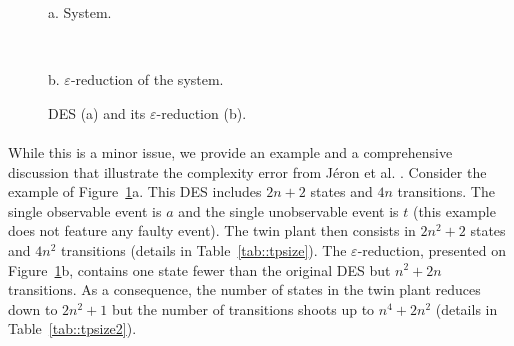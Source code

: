 \documentclass{article}
\begin{document}
\begin{figure}[ht]
\begin{minipage}{0.47\linewidth}
\begin{center}
\begin{tikzpicture}[->,>=stealth',shorten >=1pt,auto,node distance=2cm,
                    semithick]
\end{tikzpicture}
  \end{center}
  \end{minipage}

  \begin{minipage}{0.47\linewidth}
  \begin{center}
    {a. System.}
  \end{center}
  \end{minipage}\begin{minipage}{0.06\linewidth}
  \ 
  \end{minipage}\begin{minipage}{0.47\linewidth}
  \begin{center}
    {b. $\varepsilon$-reduction of the system.}
  \end{center}
  \end{minipage}
  \caption{DES (a) and its $\varepsilon$-reduction (b).}
  \label{fig::quadra}
\end{figure}

\paragraph{}
While this is a minor issue, 
we provide an example and a comprehensive discussion 
that illustrate the complexity error from J\'eron et al. 
\cite{jeron-etal::wc::08}.  
Consider the example of Figure~\ref{fig::quadra}a.  
This DES includes $2n+2$ states and $4n$ transitions.  
The single observable event is $a$ 
and the single unobservable event is $t$ 
(this example does not feature any faulty event).  
The twin plant then consists in $2n^2+2$ states and $4n^2$ transitions 
(details in Table~\ref{tab::tpsize}).  
The $\varepsilon$-reduction, presented on Figure~\ref{fig::quadra}b, 
contains one state fewer than the original DES 
but $n^2 + 2n$ transitions.  
As a consequence, the number of states in the twin plant 
reduces down to $2n^2+1$ 
but the number of transitions shoots up to $n^4+2n^2$  
(details in Table~\ref{tab::tpsize2}).  
\end{document}
